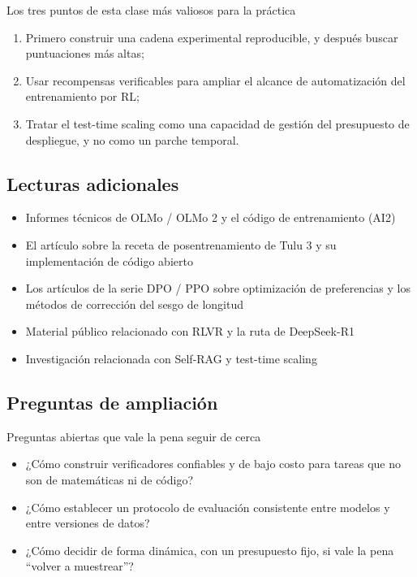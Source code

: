 \documentclass[a4paper]{article}
\begin{document}
\begin{knowledgebox}{Los tres puntos de esta clase más valiosos para la práctica}
\begin{enumerate}
    \item Primero construir una cadena experimental reproducible, y después buscar puntuaciones más altas;
    \item Usar recompensas verificables para ampliar el alcance de automatización del entrenamiento por RL;
    \item Tratar el test-time scaling como una capacidad de gestión del presupuesto de despliegue, y no como un parche temporal.
\end{enumerate}
\end{knowledgebox}

\subsection{Lecturas adicionales}
\begin{itemize}
    \item Informes técnicos de OLMo / OLMo 2 y el código de entrenamiento (AI2)
    \item El artículo sobre la receta de posentrenamiento de Tulu 3 y su implementación de código abierto
    \item Los artículos de la serie DPO / PPO sobre optimización de preferencias y los métodos de corrección del sesgo de longitud
    \item Material público relacionado con RLVR y la ruta de DeepSeek-R1
    \item Investigación relacionada con Self-RAG y test-time scaling
\end{itemize}

\subsection{Preguntas de ampliación}
\begin{warningbox}{Preguntas abiertas que vale la pena seguir de cerca}
\begin{itemize}
    \item ¿Cómo construir verificadores confiables y de bajo costo para tareas que no son de matemáticas ni de código?
    \item ¿Cómo establecer un protocolo de evaluación consistente entre modelos y entre versiones de datos?
    \item ¿Cómo decidir de forma dinámica, con un presupuesto fijo, si vale la pena ``volver a muestrear''?
\end{itemize}
\end{warningbox}

\end{document}
